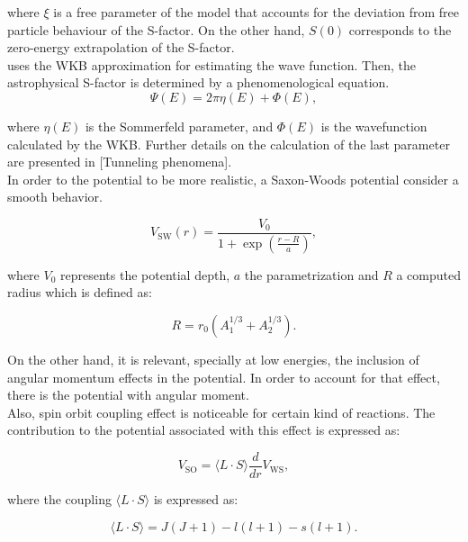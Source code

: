 \documentclass[openany]{book}
\begin{document}
where $\xi$ is a free parameter of the model that accounts for the deviation from free particle behaviour of the S-factor. On the other hand, $S(0)$ corresponds to the zero-energy extrapolation of the S-factor. \\

uses the WKB approximation for estimating the wave function. Then, the astrophysical S-factor is determined by a phenomenological equation. \\


\begin{equation}
	\Psi(E) = 2\pi\eta(E) + \Phi(E),
\end{equation}

where $\eta(E)$ is the Sommerfeld parameter, and $\Phi(E)$ is the wavefunction calculated by the WKB. Further details on the calculation of the last parameter are presented in [Tunneling phenomena]. \\

In order to the potential to be more realistic, a Saxon-Woods potential consider a smooth behavior.

\begin{equation}
	V_{\mathrm{SW}}(r) = \frac{V_0}{1 + \exp  \left({\frac{r-R}{a}}\right)},
\end{equation}


where $V_0$ represents the potential depth, $a$ the parametrization and $R$ a computed radius which is defined as: 

\begin{equation}
	R = r_0(A_1^{1/3} + A_2^{1/3}).
\end{equation}

On the other hand, it is relevant, specially at low energies, the inclusion of angular momentum effects in the potential. In order to account for that effect, there is the potential with angular moment. \\

Also, spin orbit coupling effect is noticeable for certain kind of reactions. The contribution to the potential associated with this effect is expressed as:

\begin{equation}
	V_{\mathrm{SO}} = \langle L \cdot S \rangle \frac{d}{dr} V_{\mathrm{WS}},
\end{equation}

where the coupling  $  \langle L \cdot S \rangle$ is expressed as: 

\begin{equation}
	\langle L \cdot S \rangle = J(J+1) - l(l+1) - s(l+1).
\end{equation}
\end{document}
